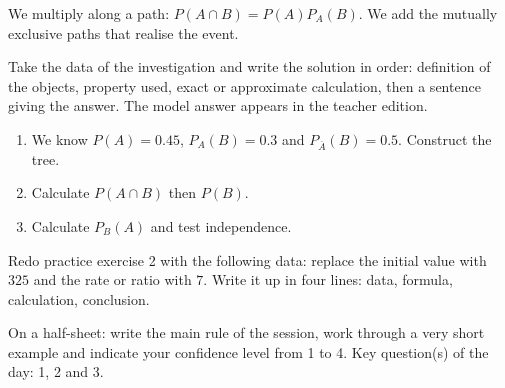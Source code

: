     \begin{traceecrite}We multiply along a path: $P(A\cap B)=P(A)P_A(B)$. We add the mutually exclusive paths that realise the event.\end{traceecrite}

    \begin{exemple}
    Take the data of the investigation and write the solution in order: definition of the objects, property used, exact or approximate calculation, then a sentence giving the answer. The model answer appears in the teacher edition.
    \end{exemple}

    \begin{exercice}[-- essential]
    \begin{enumerate}\item We know $P(A)=0.45$, $P_A(B)=0.3$ and $P_{\overline A}(B)=0.5$. Construct the tree.\item Calculate $P(A\cap B)$ then $P(B)$.\item Calculate $P_B(A)$ and test independence.\end{enumerate}
    \end{exercice}


    \begin{dm}Redo practice exercise 2 with the following data: replace the initial value with $325$ and the rate or ratio with $7$. Write it up in four lines: data, formula, calculation, conclusion.\end{dm}

    \begin{sortie}On a half-sheet: write the main rule of the session, work through a very short example and indicate your confidence level from 1 to 4. Key question(s) of the day: 1, 2 and 3.\end{sortie}

